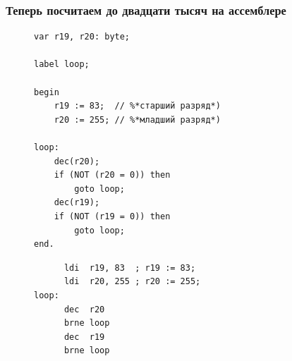 \documentclass[aspectratio=169, pdf, 8pt, unicode]{beamer}
\begin{document}
\begin{frame}[fragile]
\frametitle{Теперь посчитаем до двадцати тысяч на ассемблере}
	\begin{figure}[!htb]
		\centering
		\begin{minipage}{.45\textwidth}
			\begin{lstlisting}
var r19, r20: byte;

label loop;

begin
    r19 := 83;  // %*старший разряд*)
    r20 := 255; // %*младший разряд*)

loop:
    dec(r20);
    if (NOT (r20 = 0)) then
        goto loop;
    dec(r19);
    if (NOT (r19 = 0)) then
        goto loop;
end.
			\end{lstlisting}
		\end{minipage}
		\begin{minipage}{.45\textwidth}
			\centering
			\begin{lstlisting}
      ldi  r19, 83  ; r19 := 83;
      ldi  r20, 255 ; r20 := 255;
loop:
      dec  r20
      brne loop
      dec  r19
      brne loop
			\end{lstlisting}
		\end{minipage}
	\end{figure}
\end{frame}
\end{document}
